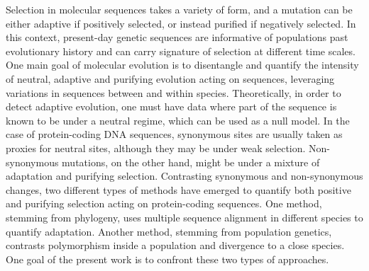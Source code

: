\documentclass{article}
\begin{document}
Selection in molecular sequences takes a variety of form, and a mutation can be either adaptive if positively selected, or instead purified if negatively selected.
In this context, present-day genetic sequences are informative of populations past evolutionary history and can carry signature of selection at different time scales.
One main goal of molecular evolution is to disentangle and quantify the intensity of neutral, adaptive and purifying evolution acting on sequences, leveraging variations in sequences between and within species.
Theoretically, in order to detect adaptive evolution, one must have data where part of the sequence is known to be under a neutral regime, which can be used as a null model.
In the case of protein-coding DNA sequences, synonymous sites are usually taken as proxies for neutral sites, although they may be under weak selection.
Non-synonymous mutations, on the other hand, might be under a mixture of adaptation and purifying selection.
Contrasting synonymous and non-synonymous changes, two different types of methods have emerged to quantify both positive and purifying selection acting on protein-coding sequences.
One method, stemming from phylogeny, uses multiple sequence alignment in different species to quantify adaptation.
Another method, stemming from population genetics, contrasts polymorphism inside a population and divergence to a close species.
One goal of the present work is to confront these two types of approaches.
\end{document}
